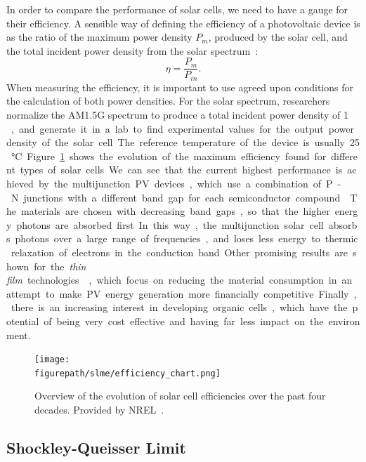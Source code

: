 \begin{refsection}
In order to compare the performance of solar cells, we need to have a gauge 
for their efficiency. A sensible way of defining the efficiency of a 
photovoltaic device is as the ratio of the maximum power density $P_m$, 
produced by the solar cell, and the total incident power density from the 
solar spectrum~\cite{Fonash2010}: 
\begin{equation} 
\eta = \frac{P_m}{P_{in}}. 
\end{equation} 
When measuring the efficiency, it is important to use agreed upon conditions 
for the calculation of both power densities. For the solar spectrum, 
researchers normalize the AM1.5G spectrum to produce a total incident power 
density of 1 \si{\watt \per \meter\square}, and generate it in a lab to find 
experimental values for the output power density of the solar cell. The 
reference temperature of the device is usually 25 \si{\celsius}. 
Figure~\ref{slme:fig-effchart} shows the evolution of the maximum efficiency 
found for different types of solar cells. We can see that the current highest 
performance is achieved by the multijunction PV devices, which use a 
combination of P-N junctions with a different band gap for each semiconductor 
compound~\cite{Dimroth2007}. The materials are chosen with decreasing band 
gaps, so that the higher energy photons are absorbed first. In this way, the 
multijunction solar cell absorbs photons over a large range of frequencies, 
and loses less energy to thermic relaxation of electrons in the conduction 
band. Other promising results are shown for the \textit{thin film} 
technologies~\cite{Shah2004}, which focus on reducing the material consumption 
in an attempt to make PV energy generation more financially competitive. 
Finally, there is an increasing interest in developing organic cells, which 
have the potential of being very cost effective and having far less impact on 
the environment. 
 
\begin{figure}[ht]  
\centering 
\texttt{[image: \\figurepath/slme/efficiency\_chart.png]} 
\caption{\label{slme:fig-effchart} Overview of the evolution of solar cell 
efficiencies over the past four decades. Provided by NREL~\cite{NREL2019}.} 
\end{figure} 
 
\subsection{Shockley-Queisser Limit} \label{slme:sec-SQlimit} 
 

\end{refsection}
